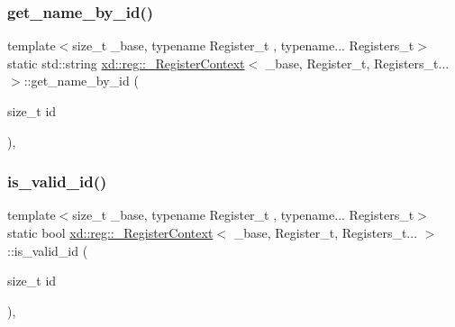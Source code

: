 \subsubsection{\texorpdfstring{get\+\_\+name\+\_\+by\+\_\+id()}{get\_name\_by\_id()}}
{\footnotesize\ttfamily template$<$size\+\_\+t \+\_\+base, typename Register\+\_\+t , typename... Registers\+\_\+t$>$ \\
static std\+::string \mbox{\hyperlink{classxd_1_1reg_1_1___register_context}{xd\+::reg\+::\+\_\+\+Register\+Context}}$<$ \+\_\+base, Register\+\_\+t, Registers\+\_\+t... $>$\+::get\+\_\+name\+\_\+by\+\_\+id (\begin{DoxyParamCaption}\item[{size\+\_\+t}]{id }\end{DoxyParamCaption})\hspace{0.3cm}{\ttfamily [inline]}, {\ttfamily [static]}}

\mbox{\label{classxd_1_1reg_1_1___register_context_3_01__base_00_01_register__t_00_01_registers__t_8_8_8_01_4_a45503882ea5a391bc3cefd1123654788}} 
\subsubsection{\texorpdfstring{is\+\_\+valid\+\_\+id()}{is\_valid\_id()}}
{\footnotesize\ttfamily template$<$size\+\_\+t \+\_\+base, typename Register\+\_\+t , typename... Registers\+\_\+t$>$ \\
static bool \mbox{\hyperlink{classxd_1_1reg_1_1___register_context}{xd\+::reg\+::\+\_\+\+Register\+Context}}$<$ \+\_\+base, Register\+\_\+t, Registers\+\_\+t... $>$\+::is\+\_\+valid\+\_\+id (\begin{DoxyParamCaption}\item[{size\+\_\+t}]{id }\end{DoxyParamCaption})\hspace{0.3cm}{\ttfamily [inline]}, {\ttfamily [static]}}



